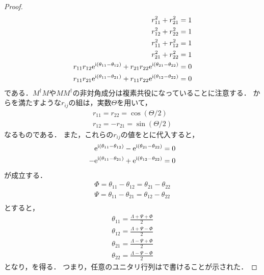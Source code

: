 \documentclass{report}
\begin{document}
\begin{proof}
\begin{align}
        r_{11}^2 + r_{21}^2 = 1 \label{r11-r21}\\ 
        r_{12}^2 + r_{22}^2 = 1 \label{r12-r22}\\ 
        r_{11}^2 + r_{12}^2 = 1 \label{r11-r12}\\ 
        r_{21}^2 + r_{22}^2 = 1 \label{r21-r22}\\ 
        r_{11}r_{12}\mathrm{e}^{\mathrm{i}(\theta_{11} - \theta_{12})} + r_{21}r_{22}\mathrm{e}^{\mathrm{i}(\theta_{21} - \theta_{22})} = 0 \label{angle-1}\\ 
        r_{11}r_{21}\mathrm{e}^{\mathrm{i}(\theta_{11} - \theta_{21})} + r_{11}r_{22}\mathrm{e}^{\mathrm{i}(\theta_{12} - \theta_{22})} = 0 \label{angle-2}
      \end{align}
      である．$M^{\dag}M$や$MM^{\dag}$の非対角成分は複素共役になっていることに注意する．
      からを満たすような$r_{ij}$の組は，実数$\Theta$を用いて，
      \begin{align}
        r_{11} = r_{22} = \cos(\Theta/2) \\ 
        r_{12} = -r_{21} = \sin(\Theta/2)
      \end{align}
      なるものである．
      また，これらの$r_{ij}$の値をとに代入すると，
      \begin{align}
        \mathrm{e}^{\mathrm{i}(\theta_{11} - \theta_{12})} - \mathrm{e}^{\mathrm{i}(\theta_{21} - \theta_{22})} = 0 \\ 
        -\mathrm{e}^{\mathrm{i}(\theta_{11} - \theta_{21})} + \mathrm{e}^{\mathrm{i}(\theta_{12} - \theta_{22})} = 0
      \end{align}
      が成立する．
      \begin{align}
        \Phi = \theta_{11} - \theta_{12} = \theta_{21} - \theta_{22} \\ 
        \Psi = \theta_{11} - \theta_{21} = \theta_{12} - \theta_{22} \\ 
      \end{align}
      とすると，
      \begin{align}
        \theta_{11} = \frac{\Lambda + \Psi + \Phi}{2} \\ 
        \theta_{12} = \frac{\Lambda + \Psi - \Phi}{2} \\ 
        \theta_{21} = \frac{\Lambda - \Psi + \Phi}{2} \\ 
        \theta_{22} = \frac{\Lambda - \Psi - \Phi}{2}
      \end{align}
      となり，を得る．
      つまり，任意のユニタリ行列はで書けることが示された．
    \end{proof}
\end{document}

